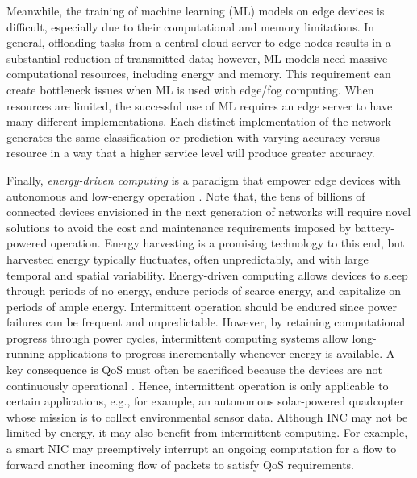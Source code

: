 Meanwhile, the training of machine learning (ML) models on edge devices is difficult, especially due to their computational and memory limitations. In general, offloading tasks from a central cloud server to edge nodes results in a substantial reduction of transmitted data; however, ML models need massive computational resources, including energy and memory. 
This requirement can create bottleneck issues when ML is used with edge/fog computing. 
When resources are limited, the successful use of ML requires  an edge server to have many different implementations. Each distinct implementation of the network generates the same classification or prediction with varying accuracy versus resource in a way that a higher service level will produce greater accuracy. 

Finally, \textit{energy-driven computing} is a paradigm that empower edge devices with autonomous and low-energy operation \cite{sliper2020energy}.  Note that, the tens of billions of connected devices envisioned in the next generation of networks will require novel solutions to avoid the cost and maintenance requirements imposed by battery-powered operation. Energy harvesting is a promising technology to this end, but harvested energy typically fluctuates, often unpredictably, and with large temporal and spatial variability. Energy-driven computing allows devices to sleep through periods of no energy, endure periods of scarce energy, and capitalize on periods of ample energy. Intermittent operation should be endured since power failures can be frequent and unpredictable. However, by retaining computational progress through power cycles, intermittent computing systems allow long-running applications to progress incrementally whenever energy is available. A key consequence is QoS must often be sacrificed because the devices are not continuously operational \cite{9403911}. Hence, intermittent operation is only applicable to certain applications, e.g., for example, an autonomous solar-powered quadcopter whose mission is to collect environmental sensor data.  Although INC may not be limited by energy, it may also benefit from intermittent computing. For example, a smart NIC may preemptively interrupt an ongoing computation for a flow to forward another incoming flow of packets to satisfy QoS requirements.



